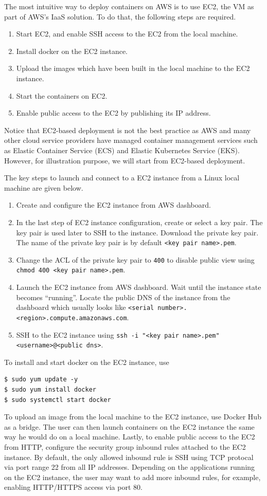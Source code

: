 The most intuitive way to deploy containers on AWS is to use EC2, the VM as part of AWS's IaaS solution. To do that, the following steps are required.

\begin{enumerate}
	\item Start EC2, and enable SSH access to the EC2 from the local machine.
	\item Install docker on the EC2 instance.
	\item Upload the images which have been built in the local machine to the EC2 instance.
	\item Start the containers on EC2.
	\item Enable public access to the EC2 by publishing its IP address.
\end{enumerate}

Notice that EC2-based deployment is not the best practice as AWS and many other cloud service providers have managed container management services such as Elastic Container Service (ECS) and Elastic Kubernetes Service (EKS). However, for illustration purpose, we will start from EC2-based deployment.

The key steps to launch and connect to a EC2 instance from a Linux local machine are given below.
\begin{enumerate}
  \item Create and configure the EC2 instance from AWS dashboard.
  \item In the last step of EC2 instance configuration, create or select a key pair. The key pair is used later to SSH to the instance. Download the private key pair. The name of the private key pair is by default \verb|<key pair name>.pem|. 
  \item Change the ACL of the private key pair to \verb|400| to disable public view using \texttt{chmod 400 <key pair name>.pem}.
  \item Launch the EC2 instance from AWS dashboard. Wait until the instance state becomes ``running''. Locate the public DNS of the instance from the dashboard which usually looks like \texttt{<serial number>.<region>.compute.amazonaws.com}.
  \item SSH to the EC2 instance using \texttt{ssh -i "<key pair name>.pem" <username>@<public dns>}.
\end{enumerate}
To install and start docker on the EC2 instance, use
\begin{lstlisting}
$ sudo yum update -y
$ sudo yum install docker
$ sudo systemctl start docker
\end{lstlisting}
To upload an image from the local machine to the EC2 instance, use Docker Hub as a bridge. The user can then launch containers on the EC2 instance the same way he would do on a local machine. Lastly, to enable public access to the EC2 from HTTP, configure the security group inbound rules attached to the EC2 instance. By default, the only allowed inbound rule is SSH using TCP protocal via port range 22 from all IP addresses. Depending on the applications running on the EC2 instance, the user may want to add more inbound rules, for example, enabling HTTP/HTTPS access via port 80.


